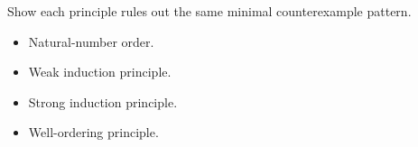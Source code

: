 \begin{remark*}
Show each principle rules out the same minimal counterexample pattern.
\end{remark*}

\begin{dependencies}
\begin{itemize}
  \item Natural-number order.
  \item Weak induction principle.
  \item Strong induction principle.
  \item Well-ordering principle.
\end{itemize}
\end{dependencies}

\clearpage
